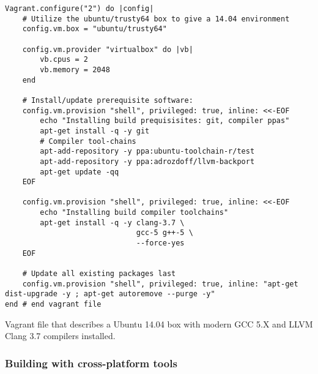 \begin{listing}[tp]
\begin{verbatim}
Vagrant.configure("2") do |config|
    # Utilize the ubuntu/trusty64 box to give a 14.04 environment
    config.vm.box = "ubuntu/trusty64"
    
    config.vm.provider "virtualbox" do |vb|
        vb.cpus = 2
        vb.memory = 2048
    end
    
    # Install/update prerequisite software:
    config.vm.provision "shell", privileged: true, inline: <<-EOF
        echo "Installing build prequisisites: git, compiler ppas"
        apt-get install -q -y git 
        # Compiler tool-chains
        apt-add-repository -y ppa:ubuntu-toolchain-r/test 
        apt-add-repository -y ppa:adrozdoff/llvm-backport 
        apt-get update -qq
    EOF
    
    config.vm.provision "shell", privileged: true, inline: <<-EOF
        echo "Installing build compiler toolchains"
        apt-get install -q -y clang-3.7 \
                              gcc-5 g++-5 \
                              --force-yes
    EOF
    
    # Update all existing packages last
    config.vm.provision "shell", privileged: true, inline: "apt-get dist-upgrade -y ; apt-get autoremove --purge -y"
end # end vagrant file 
\end{verbatim}
\caption{Vagrant file that describes a Ubuntu 14.04 box with modern GCC 5.X and LLVM Clang 3.7 compilers installed.}
\label{lst:lua:ubuntu-vagrant-box}
\end{listing} 

\subsubsection{Building with cross-platform tools}


